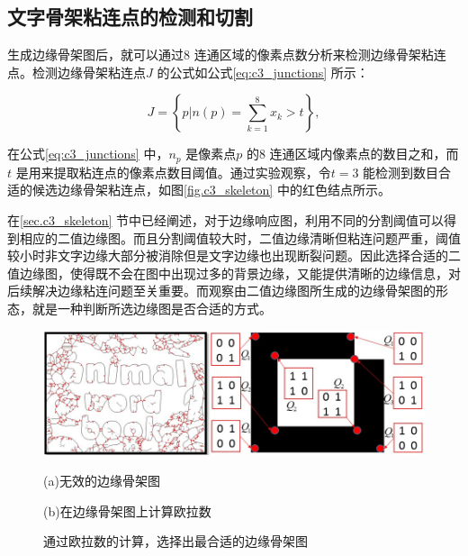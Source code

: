         \subsection{文字骨架粘连点的检测和切割}
        \label{sec.c3_skeleton_cut}

        生成边缘骨架图后，就可以通过8 连通区域的像素点数分析来检测边缘骨架粘连点。检测边缘骨架粘连点$J$ 的公式如公式\ref{eq:c3_junctions} 所示：

        \begin{equation}
        J=\left\{ p|n(p)=\sum_{k=1}^8x_k>t \right\},
        \label{eq:c3_junctions}
        \end{equation}

        在公式\ref{eq:c3_junctions} 中，$n_p$ 是像素点$p$ 的8 连通区域内像素点的数目之和，而$t$ 是用来提取粘连点的像素点数目阈值。通过实验观察，令$t = 3$ 能检测到数目合适的候选边缘骨架粘连点，如图\ref{fig.c3_skeleton} 中的红色结点所示。

        在\ref{sec.c3_skeleton} 节中已经阐述，对于边缘响应图，利用不同的分割阈值可以得到相应的二值边缘图。而且分割阈值较大时，二值边缘清晰但粘连问题严重，阈值较小时非文字边缘大部分被消除但是文字边缘也出现断裂问题。因此选择合适的二值边缘图，使得既不会在图中出现过多的背景边缘，又能提供清晰的边缘信息，对后续解决边缘粘连问题至关重要。而观察由二值边缘图所生成的边缘骨架图的形态，就是一种判断所选边缘图是否合适的方式。

        \begin{figure}[!h]
        \centering
        \includegraphics[width=\textwidth]{./figures/c3_select_skeleton.jpg}
        \begin{minipage}[t]{0.48\linewidth}
        \centerline{\small (a)无效的边缘骨架图}
        \end{minipage}
        \begin{minipage}[t]{0.48\linewidth}
        \centerline{\small (b)在边缘骨架图上计算欧拉数}
        \end{minipage}
        \caption{通过欧拉数的计算，选择出最合适的边缘骨架图}
        \label{fig.c3_select_skeleton}
        \end{figure}

